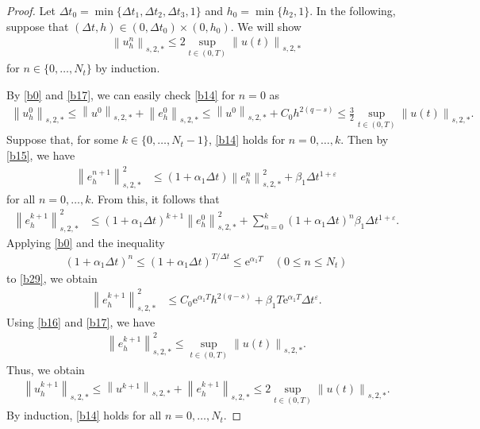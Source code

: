 \documentclass[10pt,a4paper]{amsart}
\def\norm#1#2{\left\|#2\right\|_{#1}}
\begin{document}
\begin{proof}
  Let $ \Delta t_0 = \min\{\Delta t_1, \Delta t_2, \Delta t_3, 1\} $ and $ h_0 = \min \{h_2, 1\} $. In the following, suppose that $ (\Delta t, h) \in (0, \Delta t_0) \times (0, h_0) $. We will show 
  \begin{align}
    \norm{s, 2, \ast}{u_h^n} \leq 2 \sup_{t\in (0, T)} \norm{s, 2, \ast}{u (t)}
    \label{b14}
  \end{align}
  for $ n \in \{0, \ldots, N_t\} $ by induction. 

  By \eqref{b0} and \eqref{b17}, we can easily check \eqref{b14} for $ n = 0 $ as 
  \begin{align} 
    \norm{s, 2, \ast}{u_h^0} \leq \norm{s, 2, \ast}{u^0} + \norm{s, 2, \ast}{e_h^0} \leq \norm{s, 2, \ast}{u^0} + C_0 h^{2 (q - s)} \leq \frac{3}{2} \sup_{t\in (0, T)} \norm{s, 2, \ast}{u (t)}. 
  \end{align}
  Suppose that, for some $ k \in \{0, \ldots, N_t - 1\} $, \eqref{b14} holds for $ n = 0, \ldots, k $. 
  Then by \eqref{b15}, we have 
  \begin{align} 
    \norm{s, 2, \ast}{e_h^{n + 1}}^2 & \leq \left(1 + \alpha_1 \Delta t \right) \norm{s, 2, \ast}{e_h^n}^2 + \beta_1 \Delta t^{1 + \varepsilon} 
  \end{align} 
  for all $ n = 0, \ldots, k $. From this, it follows that 
  \begin{align}
    \norm{s, 2, \ast}{e_h^{k + 1}}^2 
    & \leq \left(1 + \alpha_1 \Delta t \right)^{k + 1} \norm{s, 2, \ast}{e_h^0}^2 
    + \sum_{n = 0}^{k} \left(1 + \alpha_1 \Delta t \right)^{n} \beta_1 \Delta t^{1 + \varepsilon}. 
    \label{b29}
  \end{align}
  Applying \eqref{b0} and the inequality 
  \begin{align}
    \left(1 + \alpha_1 \Delta t \right)^{n} \leq \left(1 + \alpha_1 \Delta t \right)^{T / \Delta t} \leq \mathrm{e}^{\alpha_1 T} \quad (0 \leq n \leq N_t)
  \end{align}
  to \eqref{b29}, we obtain 
  \begin{align} 
    \norm{s, 2, \ast}{e_h^{k + 1}}^2 
    & \leq C_0 \mathrm{e}^{\alpha_1 T} h^{2 (q - s)}
    + \beta_1 T \mathrm{e}^{\alpha_1 T} \Delta t^{\varepsilon}. 
  \end{align} 
  Using \eqref{b16} and \eqref{b17}, we have 
  \begin{align} 
    \norm{s, 2, \ast}{e_h^{k + 1}}^2 \leq \sup_{t\in (0, T)} \norm{s, 2, \ast}{u (t)}. 
  \end{align} 
  Thus, we obtain 
  \begin{align} 
    \norm{s, 2, \ast}{u_h^{k + 1}} \leq \norm{s, 2, \ast}{u^{k + 1}} + \norm{s, 2, \ast}{e_h^{k + 1}} \leq 2 \sup_{t\in (0, T)} \norm{s, 2, \ast}{u (t)}. 
  \end{align} 
  By induction, \eqref{b14} holds for all $ n = 0,\ldots, N_t $. 


\end{proof}
\end{document}
